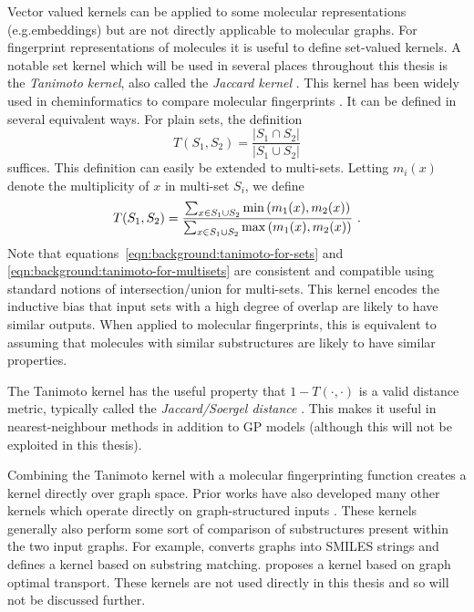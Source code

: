 Vector valued kernels can be applied to some molecular representations
(e.g.\@ embeddings) but are not directly applicable to molecular graphs.
For fingerprint representations of molecules it is useful to define set-valued kernels.
A notable set kernel which will be used in several places throughout this thesis is the
\emph{Tanimoto kernel},
also called the \emph{Jaccard kernel}
\citep{jaccard1912distribution,tanimoto1958elementary}.
This kernel has been widely used in cheminformatics to compare molecular fingerprints
\citep{ralaivola2005graph,bajusz2015tanimoto,o2016comparing,miranda2021differential}.
It can be defined in several equivalent ways.
For plain sets, the definition
\begin{equation}\label{eqn:background:tanimoto-for-sets}
    T(S_1, S_2) = \frac{\left| S_1 \cap S_2 \right|}{\left| S_1 \cup S_2 \right|}
\end{equation}
suffices.
This definition can easily be extended to multi-sets.
Letting $m_i(x)$ denote the multiplicity of $x$ in multi-set $S_i$,
we define
\begin{equation}\label{eqn:background:tanimoto-for-multisets}
    T(S_1, S_2) = \frac{\sum_{x\in S_1\cup S_2}\min\left(m_1(x), m_2(x)\right)}{\sum_{x\in S_1\cup S_2}\max\left(m_1(x), m_2(x)\right)} \hfill .
\end{equation}
Note that equations~\ref{eqn:background:tanimoto-for-sets} and \ref{eqn:background:tanimoto-for-multisets}
are consistent and compatible using standard notions of intersection/union for multi-sets.
This kernel encodes the inductive bias that input sets with a high degree of overlap
are likely to have similar outputs.
When applied to molecular fingerprints, this is equivalent to assuming
that molecules with similar substructures are likely to have similar properties.

The Tanimoto kernel has the useful property that $1-T(\cdot, \cdot)$ is a valid distance metric,
typically called the \emph{Jaccard/Soergel distance}
\citep{marczewski1958certain,levandowsky1971distance}.
This makes it useful in nearest-neighbour methods in addition to GP models
(although this will not be exploited in this thesis).

Combining the Tanimoto kernel with a molecular fingerprinting function
creates a kernel directly over graph space.
Prior works have also developed many other kernels 
which operate directly on graph-structured inputs 
\citep{nikolentzos2021graph}.
These kernels generally also perform some sort of comparison of substructures present within the two input graphs.
For example,
\citet{moss2020boss} converts graphs into SMILES strings and defines a kernel based on substring matching.
\citet{korovina2020chembo} proposes a kernel based on graph optimal transport.
These kernels are not used directly in this thesis and so will not be discussed further.


